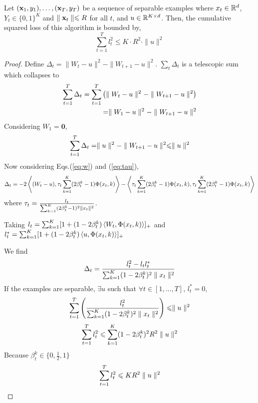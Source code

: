 \begin{theo}
\label{theo:bpa1}
Let $(\mathbf{x}_1,y_1),\dots,(\mathbf{x}_T,y_T)$ be a sequence of separable examples
where $x_t\in \mathbb{R}^d$, $Y_t\in \{0,1\}^K$ and
$\parallel{\mathbf{x}_t}\parallel \leqslant R$ for all $t$, and $u\in \mathbb{R}^{K\times d}$. 
Then, the cumulative squared loss of this algorithm is bounded by,
\begin{equation}
\sum_{t=1}^{T}l_t^2 \leqslant K\cdot R^2 \cdot \parallel{u}\parallel^2
\end{equation}
\end{theo}

\begin{proof}
Define {\small$\Delta_t = \parallel{W_t-u}\parallel^2 -\parallel{W_{t+1}-u}\parallel^2 $}.
$\sum_t\Delta_t$ is a telescopic sum which collapses to
\[
\begin{split}
\sum_{t=1}^{T} \Delta_t = \sum_{t=1}^{T} \left( \parallel{W_t-u}\parallel^2 - \parallel{W_{t+1}-u}\parallel^2\right) \\
= \parallel{W_1 - u}\parallel^2 - \parallel{W_{t+1}-u}\parallel^2
\end{split}
\]
Considering $W_1 = \mathbf{0}$,
\[\sum_{t=1}^{T} \Delta_t = \parallel{u}\parallel^2 - \parallel{W_{t+1}-u}\parallel^2\leqslant \parallel{u}\parallel^2\]
Now considering  Eqs.(\ref{eq:w}) and (\ref{eq:tau}),
\[
\Delta_t = -2\left\langle (W_t - u), \tau_t \sum_{k=1}^{K}(2\beta_t^k-1)\Phi(x_t,k) \right\rangle
- \left\langle \tau_t \sum_{k=1}^{K}(2\beta_t^k-1)\Phi(x_t,k),\tau_t \sum_{k=1}^{K}(2\beta_t^k-1)\Phi(x_t,k) \right\rangle
\]
where $\tau_t = \frac{l_t}{\sum_{k=1}^{K} (2\beta_t^k-1)^2\parallel{x_t}\parallel^2}$.

Taking $l_t = \sum_{k=1}^{K} [1+(1-2\beta_t^k)\left\langle W_t, \Phi(x_t,k)\right\rangle]_{+}$ and $l_t^{\ast} = \sum_{k=1}^{K} [1+(1-2\beta_t^k)\left\langle u, \Phi(x_t,k)\right\rangle]_{+}$

We find
\[\Delta_t = \frac{l_t^2-l_tl_t^{\ast}}{\sum_{k=1}^{K} (1-2\beta_t^k)^2\parallel{x_t}\parallel^2}\]
If the examples are separable, $\exists u$ such that $\forall t \in [1,\dots, T]$, $l_t^{\ast} = 0$, 
\[\sum_{t=1}^{T} \left( \frac{l_t^2}{\sum_{k=1}^{K} (1-2\beta_t^k)^2\parallel{x_t}\parallel^2}\right)\leqslant \parallel{u}\parallel^2
\]
\[\sum_{t=1}^{T} l_t^2 \leqslant \sum_{k=1}^{K} (1-2\beta_t^k)^2 R^2\parallel{u}\parallel^2\]
Because $\beta_t^k \in \{0, \frac{1}{2}, 1\}$
\[\sum_{t=1}^{T} l_t^2 \leqslant K R^2 \parallel{u}\parallel^2\]
\end{proof}

